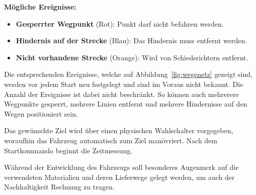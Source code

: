 \documentclass[../main.tex]{subfiles}
\begin{document}
\textbf{Mögliche Ereignisse:}
\begin{itemize}
    \item \textbf{Gesperrter Wegpunkt} (Rot): Punkt darf nicht befahren werden.
    \item \textbf{Hindernis auf der Strecke} (Blau): Das Hindernis muss entfernt werden.
    \item \textbf{Nicht vorhandene Strecke} (Orange): Wird von Schiedsrichtern entfernt.
\end{itemize}

Die entsprechenden Ereignisse, welche auf Abbildung~\ref{fig:wegenetz} gezeigt
sind, werden vor jedem Start neu festgelegt und sind im Voraus nicht bekannt.
Die Anzahl der Ereignisse ist dabei nicht beschränkt. So können auch mehrerere
Wegpunkte gesperrt, mehrere Linien entfernt und mehrere Hindernisse auf den
Wegen positioniert sein.

Das gewünschte Ziel wird über einen physischen Wahlschalter vorgegeben,
woraufhin das Fahrzeug automatisch zum Ziel manövriert. Nach dem Startkommando
beginnt die Zeitmessung.

Während der Entwicklung des Fahrzeugs soll besonderes Augenmerk auf die
verwendeten Materialien und deren Lieferwege gelegt werden, um auch der
Nachhaltigkeit Rechnung zu tragen.
\end{document}
